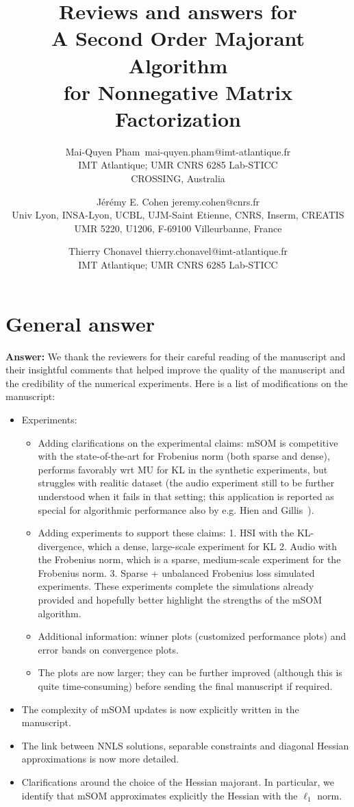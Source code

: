 \documentclass[10pt]{article} %
\title{Reviews and answers for \\ A Second Order Majorant Algorithm \\for Nonnegative Matrix Factorization}
\author{\name Mai-Quyen Pham~\email mai-quyen.pham@imt-atlantique.fr \\
      \addr  IMT Atlantique; UMR CNRS 6285 Lab-STICC\\
      \addr CROSSING, Australia\\
      \and
      \name J\'er\'emy E. Cohen \email jeremy.cohen@cnrs.fr\\
      \addr  Univ Lyon, INSA-Lyon, UCBL, UJM-Saint Etienne, CNRS, Inserm, CREATIS UMR 5220, U1206, F-69100 Villeurbanne, France 
      \and
      \name Thierry Chonavel \email thierry.chonavel@imt-atlantique.fr\\
      \addr IMT Atlantique; UMR CNRS 6285 Lab-STICC}
\newcommand{\answer}[1]{{\textbf{Answer:} \color{blue} #1}}
\begin{document}
\maketitle

\section{General answer}

\answer{
We thank the reviewers for their careful reading of the manuscript and their insightful comments that helped improve the quality of the manuscript and the credibility of the numerical experiments. Here is a list of modifications on the manuscript:
\begin{itemize}
    \item Experiments:
    \begin{itemize}
        \item Adding clarifications on the experimental claims: mSOM is competitive with the state-of-the-art for Frobenius norm (both sparse and dense), performs favorably wrt MU for KL in the synthetic experiments, but struggles with realitic dataset (the audio experiment still to be further understood when it fails in that setting; this application is reported as special for algorithmic performance also by e.g. Hien and Gillis~\cite{hien2021algorithms}).
        \item Adding experiments to support these claims: 1. HSI with the KL-divergence, which a dense, large-scale experiment for KL 2. Audio with the Frobenius norm, which is a sparse, medium-scale experiment for the Frobenius norm. 3. Sparse + unbalanced Frobenius loss simulated experiments. These experiments complete the simulations already provided and hopefully better highlight the strengths of the mSOM algorithm.
        \item Additional information: winner plots (customized performance plots) and error bands on convergence plots.
        \item The plots are now larger; they can be further improved (although this is quite time-consuming) before sending the final manuscript if required.
    \end{itemize}
    \item The complexity of mSOM updates is now explicitly written in the manuscript.
    \item The link between NNLS solutions, separable constraints and diagonal Hessian approximations is now more detailed.
    \item Clarifications around the choice of the Hessian majorant. In particular, we identify that mSOM approximates explicitly the Hessian with the $\ell_1$ norm.

\end{itemize}}
\end{document}

